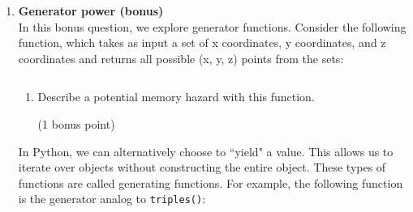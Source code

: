 \documentclass{article}
\newcounter{points}
\newcounter{bonuspoints}
\newcommand\setpoints[1]{\addtocounter{points}{#1}(#1 points)}
\newcommand\setbonuspoint{\addtocounter{bonuspoints}{1}(1 bonus point)}
\begin{document}
\begin{enumerate}
\begin{itemize}
\item Download the Debian virtual machine on the class web site (\url{http://stanford.edu/~arbenson/cme193/cme193-debian-6.0.7.ova.zip}), which you can run with VirtualBox (\url{https://www.virtualbox.org/}).
\item Download and install NumPy and SciPy on your computer.  Some instructions can be found at \url{http://docs.scipy.org/doc/numpy/user/install.html} and \url{http://www.scipy.org/Installing_SciPy}.
\item Log in to the Stanford corn machines (\texttt{corn.stanford.edu}).  They have NumPy and SciPy installed.
\end{itemize}

\begin{enumerate}
\item Run the \texttt{dot()} example from \url{http://www.scipy.org/Numpy_Example_List_With_Doc}.

\setpoints{0}.
\end{enumerate}

\begin{enumerate}
\setcounter{enumii}{1}
\item Run the \texttt{integrate.quad()} example from \url{http://www.scipy.org/scipy_Example_List}.

\setpoints{0}.
\end{enumerate}


\item \textbf{Generator power (bonus)} \\
In this bonus question, we explore generator functions.  Consider the following function, which takes as input a set of x coordinates, y coordinates, and z coordinates and returns all possible (x, y, z) points from the sets:

\begin{tabular}{c}

\end{tabular}

\begin{enumerate}
\item
Describe a potential memory hazard with this function.   \setbonuspoint \\
\end{enumerate}

In Python, we can alternatively choose to ``yield" a value.  This allows us to iterate over objects without constructing the entire object.  These types of functions are called generating functions.  For example, the following function is the generator analog to \texttt{triples()}:


\end{enumerate}
\end{document}
